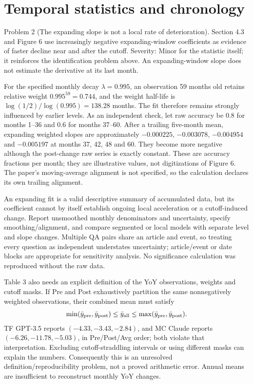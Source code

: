 \documentclass[10pt]{article}
\begin{document}
\section*{Temporal statistics and chronology}
Problem 2 (The expanding slope is not a local rate of deterioration).  Section 4.3 and Figure 6 use increasingly negative expanding-window coefficients as evidence of faster decline near and after the cutoff. Severity: Minor for the statistic itself; it reinforces the identification problem above. An expanding-window slope does not estimate the derivative at its last month.\par
For the specified monthly decay \(\lambda=0.995\), an observation 59 months old retains relative weight \(0.995^{59}=0.744\), and the weight half-life is \(\log(1/2)/\log(0.995)=138.28\) months. The fit therefore remains strongly influenced by earlier levels. As an independent check, let raw accuracy be \(0.8\) for months 1–36 and \(0.6\) for months 37–60. After a trailing five-month mean, expanding weighted slopes are approximately \(-0.000225\), \(-0.003078\), \(-0.004954\) and \(-0.005197\) at months 37, 42, 48 and 60. They become more negative although the post-change raw series is exactly constant. These are accuracy fractions per month; they are illustrative values, not digitizations of Figure 6. The paper’s moving-average alignment is not specified, so the calculation declares its own trailing alignment.\par
An expanding fit is a valid descriptive summary of accumulated data, but its coefficient cannot by itself establish ongoing local acceleration or a cutoff-induced change. Report unsmoothed monthly denominators and uncertainty, specify smoothing/alignment, and compare segmented or local models with separate level and slope changes. Multiple QA pairs share an article and event, so treating every question as independent understates uncertainty; article/event or date blocks are appropriate for sensitivity analysis. No significance calculation was reproduced without the raw data.\par
Table 3 also needs an explicit definition of the YoY observations, weights and cutoff masks. If Pre and Post exhaustively partition the same nonnegatively weighted observations, their combined mean must satisfy \[\min(\bar y_{\rm pre},\bar y_{\rm post})\leq\bar y_{\rm all}
 \leq\max(\bar y_{\rm pre},\bar y_{\rm post}).\] TF GPT-3.5 reports \((-4.33,-3.43,-2.84)\), and MC Claude reports \((-6.26,-11.78,-5.03)\), in Pre/Post/Avg order; both violate that interpretation. Excluding cutoff-straddling intervals or using different masks can explain the numbers. Consequently this is an unresolved definition/reproducibility problem, not a proved arithmetic error. Annual means are insufficient to reconstruct monthly YoY changes.\par
\end{document}
